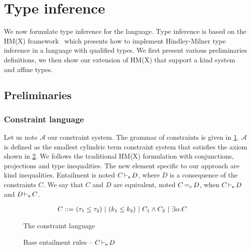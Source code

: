 \section{Type inference}

We now formulate type inference for the \lang language. Type inference is
based on the HM(X) framework~\citep{DBLP:journals/tapos/OderskySW99} which
presents how to implement Hindley-Milner type inference in a language
with qualified types. We first present various preliminaries definitions,
we then show our extension of HM(X) that support a kind system and affine
types.

\subsection{Preliminaries}

\subsubsection{Constraint language}

\newcommand\A{\mathcal A}
\newcommand\SC{\mathcal S}

Let us note $\A$ our constraint system. The grammar of constraints is
given in  \cref{grammar:constraint}.
$\A$ is defined as the smallest cylindric term constraint system that
satisfies the axiom shown in \cref{rules:entail}.
We follows the traditional HM(X) formulation
with conjunctions, projections and type inequalities.
The new element specific to our approach are kind inequalities.
Entailment is noted $C \operatorname{\vdash_e} D$, where $D$ is a consequence of the
constraints $C$.
We say that $C$ and $D$ are equivalent, noted $C \operatorname{=_e} D$,
when $C \operatorname{\vdash_e} D$ and $D \operatorname{\vdash_e} C$.


\begin{figure}[tp]
  \centering
  \begin{align*}
    C ::=&\ (\tau_1 \leq \tau_2)\ |\ (k_1 \leq k_2)\ |\ C_1 \wedge C_2\ |\ \exists \alpha.C
  \end{align*}
  \caption{The constraint language}
  \label{grammar:constraint}
\end{figure}

\begin{figure*}[tp]
  
  \caption{Lattice inequalities -- $k \lk_\Lat k'$}
  
  \caption{Base entailment rules -- $C \operatorname{\vdash_e} D$ }
  \label{rules:entail}
\end{figure*}


